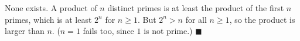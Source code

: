 None exists. A product of $n$ distinct primes is at least the product of the first $n$ primes, which is at least $2^n$ for $n\ge1$. But $2^n>n$ for all $n\ge1$, so the product is larger than $n$. ($n=1$ fails too, since $1$ is not prime.) $\blacksquare$
